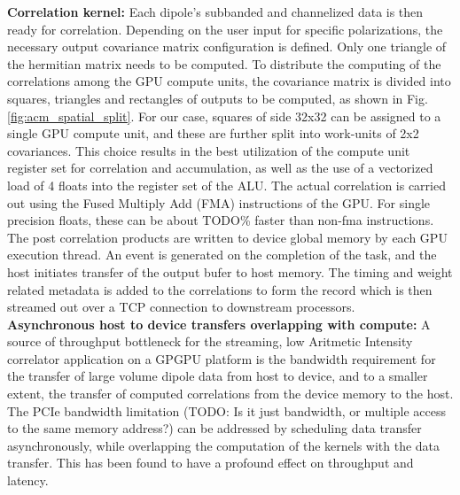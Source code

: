 \documentclass{ws-jai}
\begin{document}
\noindent \textbf {Correlation kernel:}  Each dipole's subbanded and channelized
data is  then ready for correlation.   Depending on the user  input for specific
polarizations,  the   necessary  output   covariance  matrix   configuration  is
defined. Only  one triangle  of the  hermitian matrix needs  to be  computed. To
distribute the  computing of the correlations  among the GPU compute  units, the
covariance matrix is  divided into squares, triangles and  rectangles of outputs
to be  computed, as  shown in Fig.   \ref{fig:acm_spatial_split}. For  our case,
squares of side  32x32 can be assigned  to a single GPU compute  unit, and these
are further split into work-units of 2x2 covariances. This choice results in the
best  utilization  of  the  compute   unit  register  set  for  correlation  and
accumulation, as  well as  the use  of a vectorized  load of  4 floats  into the
register set of the ALU.  The actual  correlation is carried out using the Fused
Multiply Add (FMA) instructions of the  GPU.  For single precision floats, these
can  be about  TODO\% faster  than non-fma  instructions.  The  post correlation
products are written  to device global memory by each  GPU execution thread.  An
event  is generated  on  the completion  of  the task,  and  the host  initiates
transfer  of the  output bufer  to host  memory. The  timing and  weight related
metadata is added to the correlations to  form the record which is then streamed
out over a TCP connection to downstream processors.\\

\noindent  \textbf  {Asynchronous  host  to device  transfers  overlapping  with
  compute:} A source  of throughput bottleneck for the  streaming, low Aritmetic
Intensity  correlator  application   on  a  GPGPU  platform   is  the  bandwidth
requirement for  the transfer of large  volume dipole data from  host to device,
and to a  smaller extent, the transfer of computed  correlations from the device
memory to the  host. The PCIe bandwidth limitation (TODO:  Is it just bandwidth,
or multiple access  to the same memory address?) can  be addressed by scheduling
data transfer asynchronously,  while overlapping the computation  of the kernels
with  the data  transfer.  This  has been  found to  have a  profound effect  on
throughput and latency.\\
\end{document}
